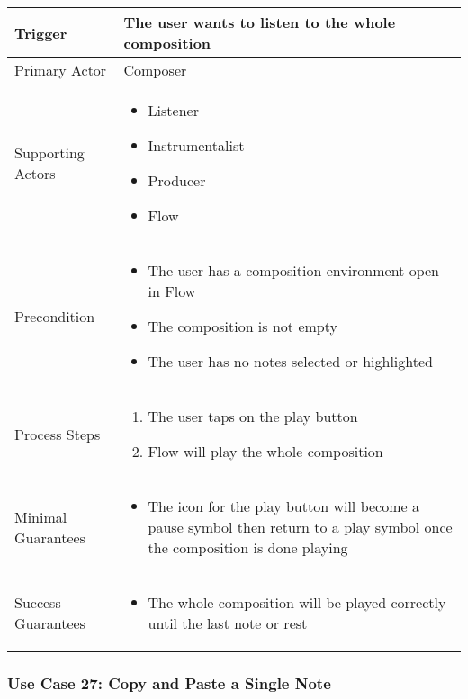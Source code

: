 \begin{tabularx}{\textwidth}{|X|X|}
\hline
Trigger & 
The user wants to listen to the whole composition \\
\hline
Primary Actor & 
Composer \\
\hline
Supporting Actors & 
\begin{itemize}
\item Listener
\item Instrumentalist
\item Producer
\item Flow
\end{itemize} \\
\hline
Precondition & 
\begin{itemize}
\item The user has a composition environment open in Flow
\item The composition is not empty
\item The user has no notes selected or highlighted
\end{itemize} \\
\hline
Process Steps & 
\begin{enumerate}
\item The user taps on the play button
\item Flow will play the whole composition
\end{enumerate} \\
\hline
Minimal Guarantees & 
\begin{itemize}
  \item The icon for the play button will become a pause symbol then return to a play symbol once the composition is done playing
\end{itemize} \\
\hline
Success Guarantees & 
\begin{itemize}
  \item The whole composition will be played correctly until the last note or rest
\end{itemize} \\
\hline
\end{tabularx}

\subsubsection{Use Case 27: Copy and Paste a Single Note}

